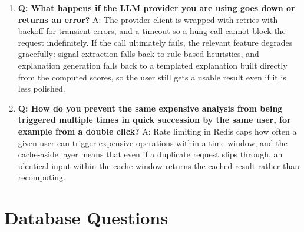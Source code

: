 \documentclass[11pt,a4paper]{report}
\begin{document}
\begin{enumerate}[leftmargin=*]
\item \textbf{Q: What happens if the LLM provider you are using goes down or returns an error?}
A: The provider client is wrapped with retries with backoff for transient errors, and a timeout so a hung call cannot block the request indefinitely. If the call ultimately fails, the relevant feature degrades gracefully: signal extraction falls back to rule based heuristics, and explanation generation falls back to a templated explanation built directly from the computed scores, so the user still gets a usable result even if it is less polished.

\item \textbf{Q: How do you prevent the same expensive analysis from being triggered multiple times in quick succession by the same user, for example from a double click?}
A: Rate limiting in Redis caps how often a given user can trigger expensive operations within a time window, and the cache-aside layer means that even if a duplicate request slips through, an identical input within the cache window returns the cached result rather than recomputing.
\end{enumerate}

\section{Database Questions}
\end{document}
